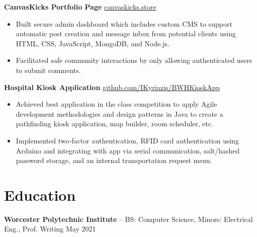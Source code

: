 \documentclass[11pt]{article}       %
\begin{document}
\textbf{CanvasKicks Portfolio Page} \hfill \href{https://canvaskicks.store}{canvaskicks.store} \\
\vspace{-9pt}
\begin{itemize}
  \item Built secure admin dashboard which includes custom CMS to support automatic post creation and message inbox from potential clients using HTML, CSS, JavaScript, MongoDB, and Node.js.
  \item Facilitated safe community interactions by only allowing authenticated users to submit comments.
\end{itemize}

\textbf{Hospital Kiosk Application} \hfill \href{https://github.com/IKyriazis/BWHKioskApp/commits?author=IKyriazis}{github.com/IKyriazis/BWHKioskApp} \\
\vspace{-9pt}
\begin{itemize}
  \item Achieved best application in the class competition to apply Agile development methodologies and design patterns in Java to create a pathfinding kiosk application, map builder, room scheduler, etc.
  \item Implemented two‐factor authentication, RFID card authentication using Arduino and integrating with app via serial communication, salt/hashed password storage, and an internal transportation request menu.
\end{itemize}


\vspace{-18.5pt}

\section*{Education}
\textbf{Worcester Polytechnic Institute} -- BS: Computer Science, Minors: Electrical Eng., Prof. Writing \hfill May 2021
\end{document}

